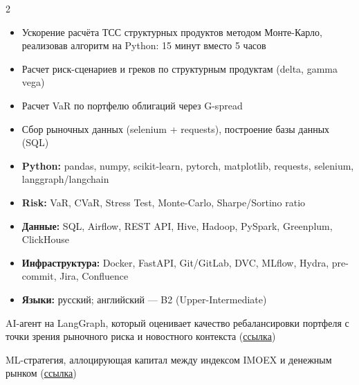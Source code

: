 \documentclass[9pt,a4paper,ragged2e]{altacv}
\begin{document}
\begin{paracol}{2}
\divider

\skipsmall
\begin{itemize}[leftmargin=12pt]
  \item Ускорение расчёта ТСС структурных продуктов методом Монте-Карло, реализовав алгоритм на Python: 15 минут вместо 5 часов
  \item Расчет риск-сценариев и греков по структурным продуктам (delta, gamma vega)
  \item Расчет VaR по портфелю облигаций через G-spread
  \item Сбор рыночных данных (selenium + requests), построение базы данных (SQL)
\end{itemize}

\switchcolumn


\begin{itemize}[leftmargin=12pt]
  \item \textbf{Python:} pandas, numpy, scikit-learn, pytorch, matplotlib, requests, selenium, langgraph/langchain
  \item \textbf{Risk:} VaR, CVaR, Stress Test, Monte-Carlo, Sharpe/Sortino ratio
  \item \textbf{Данные:} SQL, Airflow, REST API, Hive, Hadoop, PySpark, Greenplum, ClickHouse
  \item \textbf{Инфраструктура:} Docker, FastAPI, Git/GitLab, DVC, MLflow, Hydra, pre-commit, Jira, Confluence
  \item \textbf{Языки:} русский; английский --- B2 (Upper-Intermediate)
\end{itemize}


AI-агент на LangGraph, который оценивает качество ребалансировки портфеля с точки зрения рыночного риска и новостного контекста (\hyperlink{https://github.com/EdA20/PorfolioRiskAgent}{ссылка})

\divider

ML-стратегия, аллоцирующая капитал между индексом IMOEX и денежным рынком (\hyperlink{https://github.com/EdA20/Investment-Portfolio-Construction}{ссылка})



\end{paracol}
\end{document}
